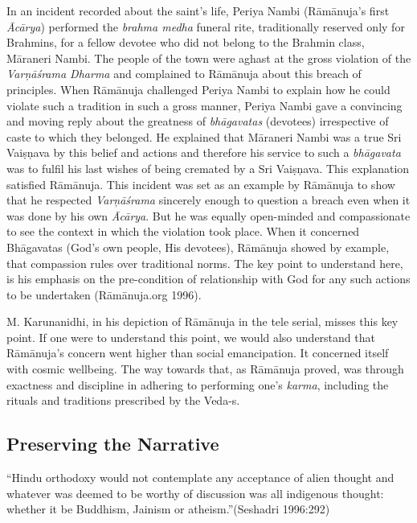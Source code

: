 In an incident recorded about the saint’s life, Periya Nambi (Rāmānuja’s first \textit{Ācārya}) performed the \textit{brahma medha} funeral rite, traditionally reserved only for Brahmins, for a fellow devotee who did not belong to the Brahmin class, Māraneri Nambi. The people of the town were aghast at the gross violation of the \textit{Varņāśrama Dharma} and complained to Rāmānuja about this breach of principles. When Rāmānuja challenged Periya Nambi to explain how he could violate such a tradition in such a gross manner, Periya Nambi gave a convincing and moving reply about the greatness of \textit{bhāgavatas} (devotees) irrespective of caste to which they belonged. He explained that Māraneri Nambi was a true Sri Vaiṣņava by this belief and actions and therefore his service to such a \textit{bhāgavata} was to fulfil his last wishes of being cremated by a Sri Vaiṣņava. This explanation satisfied Rāmānuja. This incident was set as an example by Rāmānuja to show that he respected\textit{ Varņāśrama} sincerely enough to question a breach even when it was done by his own \textit{Ācārya}. But he was equally open-minded and compassionate to see the context in which the violation took place. When it concerned Bhāgavatas (God’s own people, His devotees), Rāmānuja showed by example, that compassion rules over traditional norms. The key point to understand here, is his emphasis on the pre-condition of relationship with God for any such actions to be undertaken (Rāmānuja.org 1996).

M. Karunanidhi, in his depiction of Rāmānuja in the tele serial, misses this key point. If one were to understand this point, we would also understand that Rāmānuja’s concern went higher than social emancipation. It concerned itself with cosmic wellbeing. The way towards that, as Rāmānuja proved, was through exactness and discipline in adhering to performing one’s \textit{karma}, including the rituals and traditions prescribed by the Veda-s.


\subsection*{Preserving the Narrative}

\begin{myquote}
“Hindu orthodoxy would not contemplate any acceptance of alien thought and whatever was deemed to be worthy of discussion was all indigenous thought: whether it be Buddhism, Jainism or atheism.”(Seshadri 1996:292)
\end{myquote}

